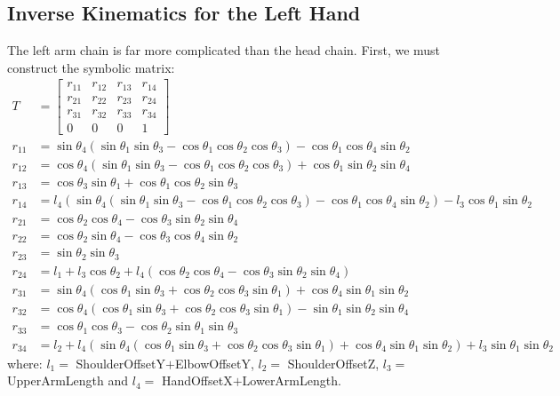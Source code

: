 \subsection{Inverse Kinematics for the Left Hand}
The left arm chain is far more complicated than the head chain. First, we must construct the symbolic matrix:
\begin{align*}
T &= \begin{bmatrix}
r_{11} & r_{12} & r_{13} & r_{14}\\
r_{21} & r_{22} & r_{23} & r_{24}\\
r_{31} & r_{32} & r_{33} & r_{34}\\
0 & 0 & 0 & 1
\end{bmatrix}\\
r_{11} &= \sin\theta_4\left(\sin\theta_1\sin\theta_3 - \cos\theta_1\cos\theta_2\cos\theta_3\right) - \cos\theta_1\cos\theta_4\sin\theta_2\\
r_{12} &= \cos\theta_4\left(\sin\theta_1\sin\theta_3 - \cos\theta_1\cos\theta_2\cos\theta_3\right) + \cos\theta_1\sin\theta_2\sin\theta_4\\
r_{13} &= \cos\theta_3\sin\theta_1 + \cos\theta_1\cos\theta_2\sin\theta_3\\
r_{14} &= l_4\left(\sin\theta_4\left(\sin\theta_1\sin\theta_3 - \cos\theta_1\cos\theta_2\cos\theta_3\right) - \cos\theta_1\cos\theta_4\sin\theta_2\right) - l_3\cos\theta_1\sin\theta_2\\
r_{21} &= \cos\theta_2\cos\theta_4 - \cos\theta_3\sin\theta_2\sin\theta_4\\
r_{22} &= \cos\theta_2\sin\theta_4 - \cos\theta_3\cos\theta_4\sin\theta_2\\
r_{23} &= \sin\theta_2\sin\theta_3\\
r_{24} &= l_1 + l_3\cos\theta_2 + l_4\left(\cos\theta_2\cos\theta_4 - \cos\theta_3\sin\theta_2\sin\theta_4\right)\\
r_{31} &= \sin\theta_4\left(\cos\theta_1\sin\theta_3 + \cos\theta_2\cos\theta_3\sin\theta_1\right) + \cos\theta_4\sin\theta_1\sin\theta_2\\
r_{32} &= \cos\theta_4\left(\cos\theta_1\sin\theta_3 + \cos\theta_2\cos\theta_3\sin\theta_1\right) - \sin\theta_1\sin\theta_2\sin\theta_4\\
r_{33} &= \cos\theta_1\cos\theta_3 - \cos\theta_2\sin\theta_1\sin\theta_3\\
r_{34} &= l_2 + l_4\left(\sin\theta_4\left(\cos\theta_1\sin\theta_3 + \cos\theta_2\cos\theta_3\sin\theta_1\right) + \cos\theta_4\sin\theta_1\sin\theta_2\right) + l_3\sin\theta_1\sin\theta_2
\end{align*}
where: $l_1 =$ ShoulderOffsetY$+$ElbowOffsetY, $l_2 =$ ShoulderOffsetZ, $l_3 =$ UpperArmLength and $l_4 =$ HandOffsetX$+$LowerArmLength.


